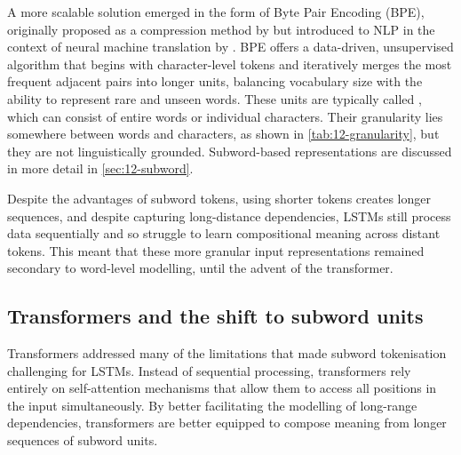A more scalable solution emerged in the form of Byte Pair Encoding (BPE), originally proposed as a compression method by \citet{gage1994new} but introduced to NLP in the context of neural machine translation by \citet{sennrich-etal-2016-bpe}. BPE offers a data-driven, unsupervised algorithm that begins with character-level tokens and iteratively merges the most frequent adjacent pairs into longer units, balancing vocabulary size with the ability to represent rare and unseen words. These units are typically called , which can consist of entire words or individual characters. Their granularity lies somewhere between words and characters, as shown in \cref{tab:12-granularity}, but they are not linguistically grounded. Subword-based representations are discussed in more detail in \cref{sec:12-subword}.


Despite the advantages of subword tokens, using shorter tokens creates longer sequences, and despite capturing long-distance dependencies, LSTMs still process data sequentially and so struggle to learn compositional meaning across distant tokens. This meant that these more granular input representations remained secondary to word-level modelling, until the advent of the transformer.

\subsection{Transformers and the shift to subword units}

Transformers \citep{vaswani2017attention} addressed many of the limitations that made subword tokenisation challenging for LSTMs. Instead of sequential processing, transformers rely entirely on self-attention mechanisms that allow them to access all positions in the input simultaneously. By better facilitating the modelling of long-range dependencies, transformers are better equipped to compose meaning from longer sequences of subword units. 

